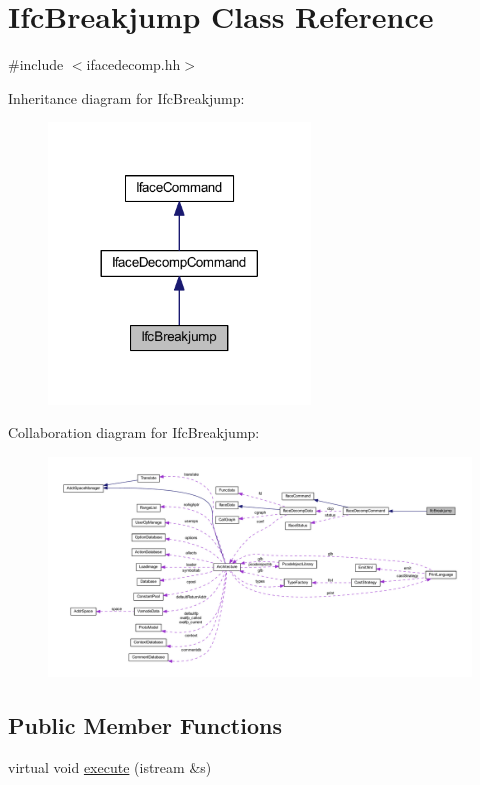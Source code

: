 \hypertarget{class_ifc_breakjump}{}\section{Ifc\+Breakjump Class Reference}
\label{class_ifc_breakjump}


{\ttfamily \#include $<$ifacedecomp.\+hh$>$}



Inheritance diagram for Ifc\+Breakjump\+:
\nopagebreak
\begin{figure}[H]
\begin{center}
\leavevmode
\includegraphics[width=197pt]{class_ifc_breakjump__inherit__graph}
\end{center}
\end{figure}


Collaboration diagram for Ifc\+Breakjump\+:
\nopagebreak
\begin{figure}[H]
\begin{center}
\leavevmode
\includegraphics[width=350pt]{class_ifc_breakjump__coll__graph}
\end{center}
\end{figure}
\subsection*{Public Member Functions}
\begin{DoxyCompactItemize}
\item 
virtual void \mbox{\hyperlink{class_ifc_breakjump_a5e19adee37bf69024ce3f6d0e8fdf30a}{execute}} (istream \&s)
\end{DoxyCompactItemize}
